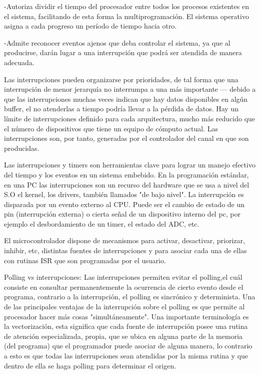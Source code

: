 \documentclass[11pt]{article}
\begin{document}
-Autoriza dividir el tiempo del procesador entre todos los procesos existentes en el sistema, facilitando de esta forma la multiprogramación. El sistema operativo asigna a cada progreso un período de tiempo hacia otro.

-Admite reconocer eventos ajenos que deba controlar el sistema, ya que al producirse, darán lugar a una interrupción que podrá ser atendida de manera adecuada.

Las interrupciones pueden organizarse por prioridades, de tal  forma que una interrupción de menor jerarquía no interrumpa a una más importante — debido a que las interrupciones muchas veces indican que hay datos disponibles en algún buffer, el no atenderlas a tiempo podría llevar a la pérdida de datos. Hay un límite de interrupciones definido para cada arquitectura, mucho más reducido que el número de dispositivos que tiene un equipo de cómputo actual. Las interrupciones son, por tanto, generadas por el controlador del canal en que son producidas.

Las interrupciones y timers son herramientas clave para lograr un manejo efectivo del tiempo y los eventos en un sistema embebido. En la programación estándar, en una PC las interrupciones son un recurso del hardware que se usa a nivel del S.O el kernel, los drivers, también llamados "de bajo nivel". La interrupción es disparada por un evento externo al CPU. Puede ser el cambio de estado de un pin (interrupción externa) o cierta señal de un dispositivo interno del pc, por ejemplo el desbordamiento de un timer, el estado del ADC, etc.

El microcontrolador dispone de mecanismos para activar, desactivar, priorizar, inhibir, etc, distintas fuentes de interrupciones y para asociar cada una de ellas con rutinas ISR que son programadas por el usuario.

Polling vs interrupciones:
Las interrupciones permiten evitar el polling,el cuál consiste en consultar permanentemente la ocurrencia de cierto evento desde el programa, contrario a la interrupción, el polling es sincrónico y determinista. Una de las principales ventajas de la interrupción sobre el polling es que permite al procesador hacer más cosas "simultáneamente". Una importante terminología es la vectorización, esta significa que cada fuente de interrupción posee una rutina de atención especializada, propia, que se ubica en alguna parte de la memoria (del programa) que el programador puede asociar de alguna manera, lo contrario a esto es que todas las interrupciones sean atendidas por la misma rutina y que dentro de ella se haga polling para determinar el origen.
\end{document}
